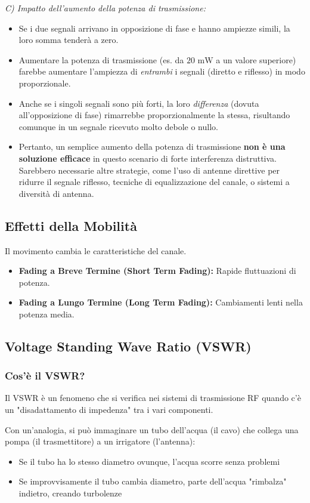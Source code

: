 \textit{C) Impatto dell'aumento della potenza di trasmissione:}
\begin{itemize}
    \item Se i due segnali arrivano in opposizione di fase e hanno ampiezze simili, la loro somma tenderà a zero.
    \item Aumentare la potenza di trasmissione (es. da $20 \text{ mW}$ a un valore superiore) farebbe aumentare l'ampiezza di \textit{entrambi} i segnali (diretto e riflesso) in modo proporzionale.
    \item Anche se i singoli segnali sono più forti, la loro \textit{differenza} (dovuta all'opposizione di fase) rimarrebbe proporzionalmente la stessa, risultando comunque in un segnale ricevuto molto debole o nullo.
    \item Pertanto, un semplice aumento della potenza di trasmissione \textbf{non è una soluzione efficace} in questo scenario di forte interferenza distruttiva. Sarebbero necessarie altre strategie, come l'uso di antenne direttive per ridurre il segnale riflesso, tecniche di equalizzazione del canale, o sistemi a diversità di antenna.
\end{itemize}

\subsection{Effetti della Mobilità}
Il movimento cambia le caratteristiche del canale.
\begin{itemize}
    \item \textbf{Fading a Breve Termine (Short Term Fading):} Rapide fluttuazioni di potenza.
    \item \textbf{Fading a Lungo Termine (Long Term Fading):} Cambiamenti lenti nella potenza media.
\end{itemize}

\subsection{Voltage Standing Wave Ratio (VSWR)}
\subsubsection{Cos'è il VSWR?}
Il VSWR è un fenomeno che si verifica nei sistemi di trasmissione RF quando c'è un "disadattamento di impedenza" tra i vari componenti.

Con un'analogia, si può immaginare un tubo dell'acqua (il cavo) che collega una pompa (il trasmettitore) a un irrigatore (l'antenna):
\begin{itemize}
    \item Se il tubo ha lo stesso diametro ovunque, l'acqua scorre senza problemi
    \item Se improvvisamente il tubo cambia diametro, parte dell'acqua "rimbalza" indietro, creando turbolenze
\end{itemize}

